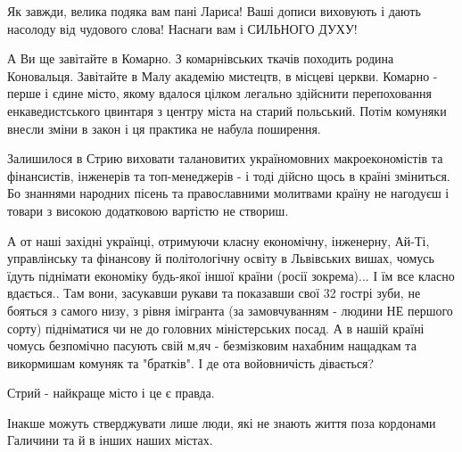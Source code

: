 \begin{itemize}
Як завжди, велика подяка вам пані Лариса! Ваші дописи виховують і дають
насолоду від чудового слова! Наснаги вам і СИЛЬНОГО ДУХУ!

 

А Ви ще завітайте в Комарно. З комарнівських ткачів походить родина Коновальця.
Завітайте в Малу академію мистецтв, в місцеві церкви. Комарно - перше і єдине
місто, якому вдалося цілком легально здійснити перепоховання енкаведистського
цвинтаря з центру міста на старий польський. Потім комуняки внесли зміни в
закон і ця практика не набула поширення.

 

Залишилося в Стрию виховати талановитих україномовних макроекономістів та
фінансистів, інженерів та топ-менеджерів - і тоді дійсно щось в країні
зміниться. Бо знаннями народних пісень та православними молитвами країну не
нагодуєш і товари з високою додатковою вартістю не створиш.

А от наші західні українці, отримуючи класну економічну, інженерну, Ай-Ті,
управлінську та фінансову й політологічну освіту в Львівських вишах, чомусь
їдуть піднімати економіку будь-якої іншої країни (росії зокрема)... І їм все
класно вдається.. Там вони, засукавши рукави та показавши свої 32 гострі зуби,
не бояться з самого низу, з рівня імігранта (за замовчуванням - людини НЕ
першого сорту) підніматися чи не до головних міністерських посад. А в нашій
країні чомусь безпомічно пасують свій м,яч - безмізковим нахабним нащадкам та
викормишам комуняк та "братків". І де ота войовничість дівається?

 

Стрий - найкраще місто і це є правда.

Інакше можуть стверджувати лише люди, які не знають життя поза кордонами
Галичини та й в інших наших містах.


\end{itemize}
